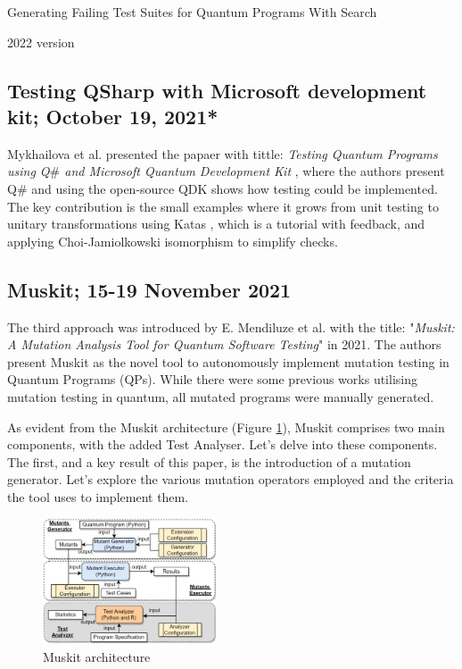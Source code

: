 \begin{itemize}
Generating Failing Test Suites for Quantum Programs With Search \cite{wang2021generating}

2022 version \cite{wang2022qusbt}

\vspace{15pt}
\subsection{Testing QSharp with Microsoft development kit; October 19, 2021*}

Mykhailova et al. presented the papaer with tittle: \textit{Testing Quantum Programs using Q$\#$ and Microsoft Quantum
Development Kit} \cite{mykhailova2021testing}, where the authors present Q$\#$ and using the open-source QDK shows how testing could be implemented. The key contribution is the small examples where it grows from unit testing to unitary transformations using Katas \cite{mykhailova2020quantum}, which is a tutorial with feedback, and applying Choi-Jamiolkowski isomorphism \cite{choi1975completely}\cite{jamiolkowski1972linear} to simplify checks.

\vspace{15pt}
\subsection{Muskit; 15-19 November 2021}
\label{Ch3.2.3:Muskit}
The third approach was introduced by E. Mendiluze et al. with the title: "\textit{Muskit: A Mutation Analysis Tool for Quantum Software Testing}"\cite{mendiluze2021muskit} in 2021. The authors present Muskit as the novel tool to autonomously implement mutation testing in Quantum Programs (QPs). While there were some previous works\cite{ali2021assessing}\cite{wang2021quito} utilising mutation testing in quantum, all mutated programs were manually generated.\newline

As evident from the Muskit architecture (Figure \ref{Fig:MuskitArch}), Muskit comprises two main components, with the added Test Analyser. Let's delve into these components. The first, and a key result of this paper, is the introduction of a mutation generator. Let's explore the various mutation operators employed and the criteria the tool uses to implement them.

\begin{figure}[H]
        \centering
        \includegraphics[width=0.46\textwidth]{TFM/photos/MuskitOverview.png}
        \caption{Muskit architecture \cite{mendiluze2021muskit}} 
        \label{Fig:MuskitArch}
\end{figure}


\end{itemize}
